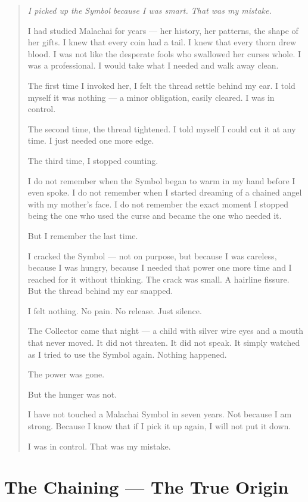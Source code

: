 \documentclass[10pt,twoside]{book}
\newenvironment{confession}
  {\begin{quote}\itshape\small\setlength{\parskip}{0.5em}}
  {\end{quote}}
\begin{document}
\begin{confession}
I picked up the Symbol because I was smart. That was my mistake.

I had studied Malachai for years --- her history, her patterns, the shape of her gifts. I knew that every coin had a tail. I knew that every thorn drew blood. I was not like the desperate fools who swallowed her curses whole. I was a professional. I would take what I needed and walk away clean.

The first time I invoked her, I felt the thread settle behind my ear. I told myself it was nothing --- a minor obligation, easily cleared. I was in control.

The second time, the thread tightened. I told myself I could cut it at any time. I just needed one more edge.

The third time, I stopped counting.

I do not remember when the Symbol began to warm in my hand before I even spoke. I do not remember when I started dreaming of a chained angel with my mother's face. I do not remember the exact moment I stopped being the one who used the curse and became the one who needed it.

But I remember the last time.

I cracked the Symbol --- not on purpose, but because I was careless, because I was hungry, because I needed that power one more time and I reached for it without thinking. The crack was small. A hairline fissure. But the thread behind my ear snapped.

I felt nothing. No pain. No release. Just silence.

The Collector came that night --- a child with silver wire eyes and a mouth that never moved. It did not threaten. It did not speak. It simply watched as I tried to use the Symbol again. Nothing happened.

The power was gone.

But the hunger was not.

I have not touched a Malachai Symbol in seven years. Not because I am strong. Because I know that if I pick it up again, I will not put it down.

I was in control. That was my mistake.
\end{confession}

\chapter{The Chaining --- The True Origin}
\end{document}
